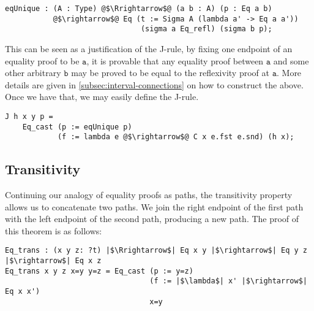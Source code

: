 \documentclass[12pt,twoside,maitrise]{dms}
\theoremstyle{definition}
\numberwithin{equation}{section}
\numberwithin{table}{chapter}
\numberwithin{figure}{chapter}
\newcommand\fn[1] {\texttt{#1}}
\begin{document}
\begin{verbatim}
eqUnique : (A : Type) @$\Rrightarrow$@ (a b : A) (p : Eq a b)
           @$\rightarrow$@ Eq (t := Sigma A (lambda a' -> Eq a a'))
                               (sigma a Eq_refl) (sigma b p);
\end{verbatim}

This can be seen as a justification of the J-rule, by fixing one endpoint of an
equality proof to be $\fn{a}$, it is provable that any equality proof between
$\fn{a}$ and some other arbitrary $\fn{b}$ may be proved to be equal to the
reflexivity proof at $\fn{a}$. More details are given in
\autoref{subsec:interval-connections} on how to construct the above. Once we have that,
we may easily define the J-rule.

\begin{verbatim}
J h x y p =
    Eq_cast (p := eqUnique p)
            (f := lambda e @$\rightarrow$@ C x e.fst e.snd) (h x);
\end{verbatim}

\subsection*{Transitivity}\label{subsection:eqtransitivity}
Continuing our analogy of equality proofs as paths, the transitivity property allows us to concatenate two paths. We join the right endpoint of the first path with the left endpoint of the second path, producing a new path. The proof of this theorem is as follows:

\begin{verbatim}
Eq_trans : (x y z: ?t) |$\Rrightarrow$| Eq x y |$\rightarrow$| Eq y z |$\rightarrow$| Eq x z
Eq_trans x y z x=y y=z = Eq_cast (p := y=z)
                                 (f := |$\lambda$| x' |$\rightarrow$| Eq x x')
                                 x=y
\end{verbatim}
\end{document}
